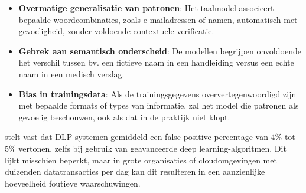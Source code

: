 \begin{itemize}
    \item \textbf{Overmatige generalisatie van patronen}: Het taalmodel associeert bepaalde woordcombinaties, zoals e-mailadressen of namen, automatisch met gevoeligheid, zonder voldoende contextuele verificatie.
    \item \textbf{Gebrek aan semantisch onderscheid}: De modellen begrijpen onvoldoende het verschil tussen bv. een fictieve naam in een handleiding versus een echte naam in een medisch verslag.
   \item \textbf{Bias in trainingsdata}: Als de trainingsgegevens oververtegenwoordigd zijn met bepaalde formats of types van informatie, zal het model die patronen als gevoelig beschouwen, ook als dat in de praktijk niet klopt.
\end{itemize}

\textcite{Olateju2024} stelt vast dat DLP-systemen gemiddeld een false positive-percentage van 4\% tot 5\% vertonen, zelfs bij gebruik van geavanceerde deep learning-algoritmen.
Dit lijkt misschien beperkt, maar in grote organisaties of cloudomgevingen met duizenden datatransacties per dag kan dit resulteren in een aanzienlijke hoeveelheid foutieve waarschuwingen.









